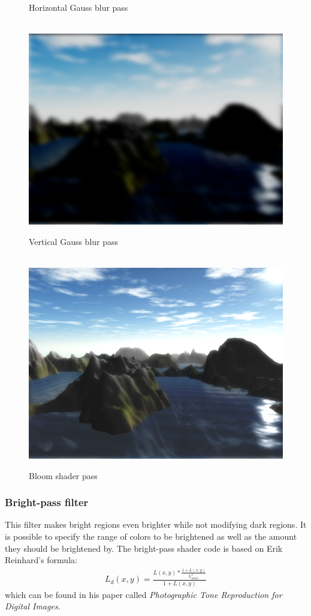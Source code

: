 \documentclass[11pt,a4paper,twoside,openright]{report}
\begin{document}
\begin{figure}[!htb]
  \caption{Horizontal Gauss blur pass}\label{fig:3rdpass}
\endminipage
\\
\centering
{}
  \includegraphics[width=\linewidth]{shader3-vertical-blur-screenshot.png}
  \caption{Vertical Gauss blur pass}\label{fig:4thpass}
\endminipage
{}
\
\endminipage
{}%
  \includegraphics[width=\linewidth]{shader4-bloom-screenshot.png}
  \caption{Bloom shader pass}\label{fig:5thpass}
\endminipage
\end{figure}

\subsubsection{Bright-pass filter}
This filter makes bright regions even brighter while not modifying dark regions. It is possible to specify the range of colors to be brightened as well as the amount they should be brightened by. The bright-pass shader code is based on Erik Reinhard's formula:
\begin{align*}
L_d(x,y) = \frac{L(x,y) * \frac{1 + L(x,y)}{L_{white}^2}}{1 + L(x,y)}
\end{align*}
which can be found in his paper \cite{Reinhard:2002:PTR:566570.566575} called \emph{Photographic Tone Reproduction for Digital Images}.
\end{document}
